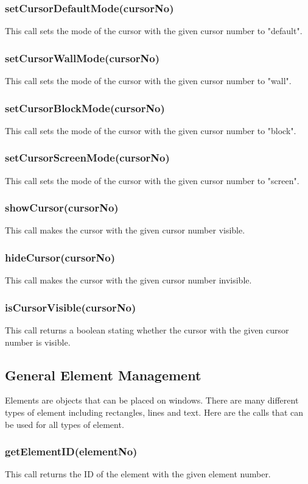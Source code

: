 \documentclass{acm_proc_article-sp}
\begin{document}
\subsubsection{setCursorDefaultMode(cursorNo)}
This call sets the mode of the cursor with the given cursor number to "default".
\subsubsection{setCursorWallMode(cursorNo)}
This call sets the mode of the cursor with the given cursor number to "wall".
\subsubsection{setCursorBlockMode(cursorNo)}
This call sets the mode of the cursor with the given cursor number to "block".
\subsubsection{setCursorScreenMode(cursorNo)}
This call sets the mode of the cursor with the given cursor number to "screen".
\subsubsection{showCursor(cursorNo)}
This call makes the cursor with the given cursor number visible.
\subsubsection{hideCursor(cursorNo)}
This call makes the cursor with the given cursor number invisible.
\subsubsection{isCursorVisible(cursorNo)}
This call returns a boolean stating whether the cursor with the given cursor number is visible.
\subsection{General Element Management}
Elements are objects that can be placed on windows. There are many different types of element including rectangles, lines and text. Here are the calls that can be used for all types of element.
\subsubsection{getElementID(elementNo)}
This call returns the ID of the element with the given element number.
\end{document}
